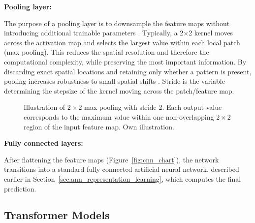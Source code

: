 \textbf{Pooling layer:}

The purpose of a pooling layer is to downsample the feature maps without introducing additional trainable parameters \citep{Montesinos2022Multivariate, o2015introduction}. Typically, a 2×2 kernel moves across the activation map and selects the largest value within each local patch (max pooling). This reduces the spatial resolution and therefore the computational complexity, while preserving the most important information. By discarding exact spatial locations and retaining only whether a pattern is present, pooling increases robustness to small spatial shifts \citep{Montesinos2022Multivariate}. Stride is the variable determining the stepsize of the kernel moving across the patch/feature map.
\begin{figure}[h]
\centering
{}
\caption{Illustration of $2 \times 2$ max pooling with stride 2. Each output value corresponds to the maximum value within one non-overlapping $2 \times 2$ region of the input feature map. Own illustration.}
\label{fig:maxpool_example}
\end{figure}


\textbf{Fully connected layers:}

After flattening the feature maps (Figure~\ref{fig:cnn_chart}), the network transitions into a standard fully connected artificial neural network, described earlier in Section~\ref{sec:ann_representation_learning}, which computes the final prediction.


\subsection{Transformer Models}
\label{sec:transformer_models}

